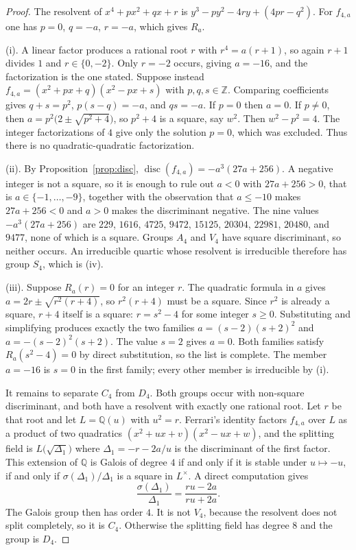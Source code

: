 \documentclass[11pt]{article}
\theoremstyle{definition}
\theoremstyle{remark}
\newcommand{\Z}{\mathbb{Z}}
\newcommand{\Q}{\mathbb{Q}}
\newcommand{\disc}{\operatorname{disc}}
\begin{document}
\begin{proof}
The resolvent of $x^{4}+px^{2}+qx+r$ is $y^{3}-py^{2}-4ry+(4pr-q^{2})$. For
$f_{4,a}$ one has $p=0$, $q=-a$, $r=-a$, which gives $R_a$.

(i). A linear factor produces a rational root $r$ with $r^{4}=a(r+1)$, so again
$r+1$ divides $1$ and $r\in\{0,-2\}$. Only $r=-2$ occurs, giving $a=-16$, and the
factorization is the one stated. Suppose instead
$f_{4,a}=(x^{2}+px+q)(x^{2}-px+s)$ with $p,q,s\in\Z$. Comparing coefficients gives
$q+s=p^{2}$, $p(s-q)=-a$, and $qs=-a$. If $p=0$ then $a=0$. If $p\neq 0$, then
$a=p^{2}\bigl(2\pm\sqrt{p^{2}+4}\bigr)$, so $p^{2}+4$ is a square, say $w^{2}$. Then
$w^{2}-p^{2}=4$. The integer factorizations of $4$ give only the solution $p=0$,
which was excluded. Thus there is no quadratic-quadratic factorization.

(ii). By Proposition~\ref{prop:disc},
$\disc(f_{4,a})=-a^{3}(27a+256)$. A negative integer is not a square, so it is
enough to rule out $a<0$ with $27a+256>0$, that is $a\in\{-1,\ldots,-9\}$, together
with the observation that $a\le -10$ makes $27a+256<0$ and $a>0$ makes the
discriminant negative. The nine values $-a^{3}(27a+256)$ are
$229$, $1616$, $4725$, $9472$, $15125$, $20304$, $22981$, $20480$, and $9477$,
none of which is a square. Groups $A_4$ and $V_4$ have square discriminant, so
neither occurs. An irreducible quartic whose resolvent is irreducible therefore
has group $S_4$, which is (iv).

(iii). Suppose $R_a(r)=0$ for an integer $r$. The quadratic formula in $a$ gives
$a=2r\pm\sqrt{r^{2}(r+4)}$, so $r^{2}(r+4)$ must be a square. Since $r^{2}$ is
already a square, $r+4$ itself is a square: $r=s^{2}-4$ for some integer $s\ge 0$.
Substituting and simplifying produces exactly the two families
$a=(s-2)(s+2)^{2}$ and $a=-(s-2)^{2}(s+2)$. The value $s=2$ gives $a=0$. Both
families satisfy $R_a(s^{2}-4)=0$ by direct substitution, so the list is complete.
The member $a=-16$ is $s=0$ in the first family; every other member is irreducible
by (i).

It remains to separate $C_4$ from $D_4$. Both groups occur with non-square
discriminant, and both have a resolvent with exactly one rational root. Let $r$
be that root and let $L=\Q(u)$ with $u^{2}=r$. Ferrari's identity factors
$f_{4,a}$ over $L$ as a product of two quadratics
$(x^{2}+ux+v)(x^{2}-ux+w)$, and the splitting field is $L\bigl(\sqrt{\Delta_1}\bigr)$
where $\Delta_1=-r-2a/u$ is the discriminant of the first factor. This extension
of $\Q$ is Galois of degree $4$ if and only if it is stable under $u\mapsto -u$,
if and only if $\sigma(\Delta_1)/\Delta_1$ is a square in $L^{\times}$. A direct
computation gives
\[
\frac{\sigma(\Delta_1)}{\Delta_1}=\frac{ru-2a}{ru+2a}.
\]
The Galois group then has order $4$. It is not $V_4$, because the resolvent does
not split completely, so it is $C_4$. Otherwise the splitting field has degree $8$
and the group is $D_4$.


\end{proof}
\end{document}
